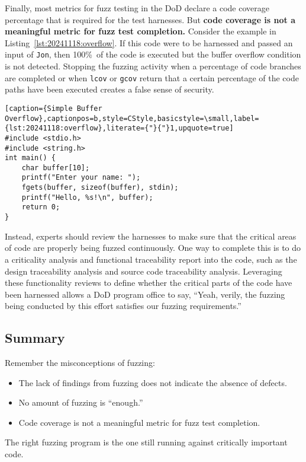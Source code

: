 Finally, most metrics for fuzz testing in the DoD declare a code coverage percentage that is required for the test harnesses. But \textbf{code coverage is not a meaningful metric for fuzz test completion.} Consider the example in Listing~\ref{lst:20241118:overflow}. If this code were to be harnessed and passed an input of \texttt{Jon}, then 100\%\ of the code is executed but the buffer overflow condition is not detected. Stopping the fuzzing activity when a percentage of code branches are completed or when \texttt{lcov} or \texttt{gcov} return that a certain percentage of the code paths have been executed creates a false sense of security.

\begin{lstlisting}[caption={Simple Buffer Overflow},captionpos=b,style=CStyle,basicstyle=\small,label={lst:20241118:overflow},literate={"}{"}1,upquote=true]
#include <stdio.h>
#include <string.h>
int main() {
    char buffer[10];
    printf("Enter your name: ");
    fgets(buffer, sizeof(buffer), stdin);
    printf("Hello, %s!\n", buffer);
    return 0;
}
\end{lstlisting}

Instead, experts should review the harnesses to make sure that the critical areas of code are properly being fuzzed continuously. One way to complete this is to do a criticality analysis and functional traceability report into the code, such as the design traceability analysis\autocite[\pno~114]{20241118:ieee1012} and source code traceability analysis\autocite[\pno~119]{20241118:ieee1012}. Leveraging these functionality reviews to define whether the critical parts of the code have been harnessed allows a DoD program office to say, ``Yeah, verily, the fuzzing being conducted by this effort satisfies our fuzzing requirements.''

\subsection*{Summary}
Remember the misconceptions of fuzzing:
\begin{itemize}
    \item The lack of findings from fuzzing does not indicate the absence of defects.
    \item No amount of fuzzing is ``enough.''
    \item Code coverage is not a meaningful metric for fuzz test completion.
\end{itemize}

The right fuzzing program is the one still running against critically important code.
